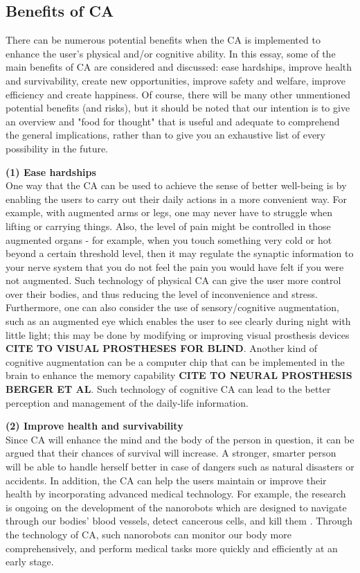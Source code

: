\subsection{Benefits of CA}

There can be numerous potential benefits when the CA is implemented to enhance the user's physical and/or cognitive ability. In this essay, some of the main benefits of CA are considered and discussed: ease hardships, improve health and survivability, create new opportunities, improve safety and welfare, improve efficiency and create happiness. Of course, there will be many other unmentioned potential benefits (and risks), but it should be noted that our intention is to give an overview and "food for thought" that is useful and adequate to comprehend the general implications, rather than to give you an exhaustive list of every possibility in the future. 

{\bf (1) Ease hardships} \\ 
One way that the CA can be used to achieve the sense of better well-being is by enabling the users to carry out their daily actions in a more convenient way. For example, with augmented arms or legs, one may never have to struggle when lifting or carrying things. Also, the level of pain might be controlled in those augmented organs - for example, when you touch something very cold or hot beyond a certain threshold level, then it may regulate the synaptic information to your nerve system that you do not feel the pain you would have felt if you were not augmented. Such technology of physical CA can give the user more control over their bodies, and thus reducing the level of inconvenience and stress. Furthermore, one can also consider the use of sensory/cognitive augmentation, such as an augmented eye which enables the user to see clearly during night with little light; this may be done by modifying or improving visual prosthesis devices {\bf CITE TO VISUAL PROSTHESES FOR BLIND}. Another kind of cognitive augmentation can be a computer chip that can be implemented in the brain to enhance the memory capability {\bf CITE TO NEURAL PROSTHESIS BERGER ET AL}. Such technology of cognitive CA can lead to the better perception and management of the daily-life information.

{\bf (2) Improve health and survivability} \\
Since CA will enhance the mind and the body of the person in question, it can be argued that their chances of survival will increase. A stronger, smarter person will be able to handle herself better in case of dangers such as natural disasters or accidents. In addition, the CA can help the users maintain or improve their health by incorporating advanced medical technology. For example, the research is ongoing on the development of the nanorobots which are designed to navigate through our bodies' blood vessels, detect cancerous cells, and kill them \cite{nanorobot}. Through the technology of CA, such nanorobots can monitor our body more comprehensively, and perform medical tasks more quickly and efficiently at an early stage. 

